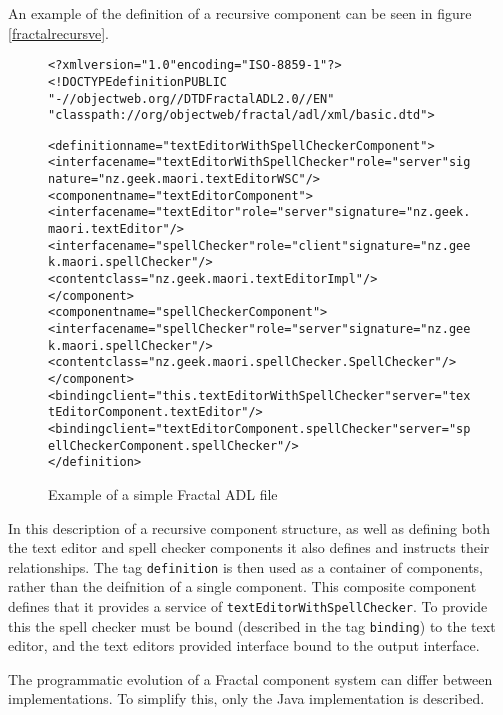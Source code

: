 An example of the definition of a recursive component can be seen in figure \ref{fractalrecursve}.

\begin{figure}[htp]
\begin{center}
\begin{alltt}
<?xml version="1.0" encoding="ISO-8859-1" ?>
<!DOCTYPE definition PUBLIC 
    "-//objectweb.org//DTD Fractal ADL 2.0//EN" 
    "classpath://org/objectweb/fractal/adl/xml/basic.dtd">

<definition name="textEditorWithSpellCheckerComponent">
  <interface name="textEditorWithSpellChecker" role="server" signature="nz.geek.maori.textEditorWSC"/>
  <component name="textEditorComponent">
    <interface name="textEditor" role="server" signature="nz.geek.maori.textEditor"/>
    <interface name="spellChecker" role="client" signature="nz.geek.maori.spellChecker"/>
    <content class="nz.geek.maori.textEditorImpl"/>
  </component>
  <component name="spellCheckerComponent">
    <interface name="spellChecker" role="server" signature="nz.geek.maori.spellChecker"/>
    <content class="nz.geek.maori.spellChecker.SpellChecker"/>
  </component>
  <binding client="this.textEditorWithSpellChecker" server="textEditorComponent.textEditor"/>
  <binding client="textEditorComponent.spellChecker" server="spellCheckerComponent.spellChecker"/>
</definition>
\end{alltt}
  \caption[Fractal ADL Example]{Example of a simple Fractal ADL file}
  \label{fractalmetadata}
\end{center}
\end{figure}

In this description of a recursive component structure, as well as defining both the text editor and spell checker components it also defines and instructs their relationships.
The tag \verb+definition+ is then used as a container of components, rather than the deifnition of a single component.
This composite component defines that it provides a service of \verb+textEditorWithSpellChecker+.
To provide this the spell checker must be bound (described in the tag \verb+binding+) to the text editor,
and the text editors provided interface bound to the output interface. 

The programmatic evolution of a Fractal component system can differ between implementations.
To simplify this, only the Java implementation is described. 

